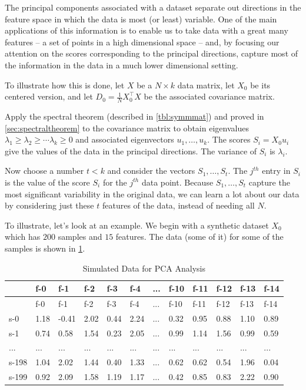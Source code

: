 \documentclass[
]{article}
\begin{document}
The principal components associated with a dataset separate out
directions in the feature space in which the data is most (or least)
variable. One of the main applications of this information is to enable
us to take data with a great many features -- a set of points in a high
dimensional space -- and, by focusing our attention on the scores
corresponding to the principal directions, capture most of the
information in the data in a much lower dimensional setting.

To illustrate how this is done, let \(X\) be a \(N\times k\) data
matrix, let \(X_{0}\) be its centered version, and let
\(D_{0} = \frac{1}{N}X_{0}^{\intercal}X\) be the associated covariance
matrix.

Apply the spectral theorem (described in \cref{tbl:symmmat}) and proved
in \cref{sec:spectraltheorem} to the covariance matrix to obtain
eigenvalues \(\lambda_{1}\ge \lambda_{2}\ge\cdots \lambda_{k}\ge 0\) and
associated eigenvectors \(u_{1},\ldots, u_{k}\). The scores
\(S_{i}=X_{0}u_{i}\) give the values of the data in the principal
directions. The variance of \(S_{i}\) is \(\lambda_{i}\).

Now choose a number \(t<k\) and consider the vectors
\(S_{1},\ldots, S_{t}\). The \(j^{th}\) entry in \(S_{i}\) is the value
of the score \(S_{i}\) for the \(j^{th}\) data point. Because
\(S_{1},\ldots, S_{t}\) capture the most significant variability in the
original data, we can learn a lot about our data by considering just
these \(t\) features of the data, instead of needing all \(N\).

To illustrate, let's look at an example. We begin with a synthetic
dataset \(X_{0}\) which has \(200\) samples and \(15\) features. The
data (some of it) for some of the samples is shown in
\cref{tbl:rawdata}.

\begin{longtable}[]{@{}llllllllllll@{}}
\caption{Simulated Data for PCA Analysis
\label{tbl:rawdata}}\tabularnewline
\toprule
& f-0 & f-1 & f-2 & f-3 & f-4 & ... & f-10 & f-11 & f-12 & f-13 &
f-14\tabularnewline
\midrule
\endfirsthead
\toprule
& f-0 & f-1 & f-2 & f-3 & f-4 & ... & f-10 & f-11 & f-12 & f-13 &
f-14\tabularnewline
\midrule
\endhead
s-0 & 1.18 & -0.41 & 2.02 & 0.44 & 2.24 & ... & 0.32 & 0.95 & 0.88 &
1.10 & 0.89\tabularnewline
s-1 & 0.74 & 0.58 & 1.54 & 0.23 & 2.05 & ... & 0.99 & 1.14 & 1.56 & 0.99
& 0.59\tabularnewline
... & ... & ... & ... & ... & ... & ... & ... & ... & ... & ... &
...\tabularnewline
s-198 & 1.04 & 2.02 & 1.44 & 0.40 & 1.33 & ... & 0.62 & 0.62 & 0.54 &
1.96 & 0.04\tabularnewline
s-199 & 0.92 & 2.09 & 1.58 & 1.19 & 1.17 & ... & 0.42 & 0.85 & 0.83 &
2.22 & 0.90\tabularnewline
\bottomrule
\end{longtable}
\end{document}
